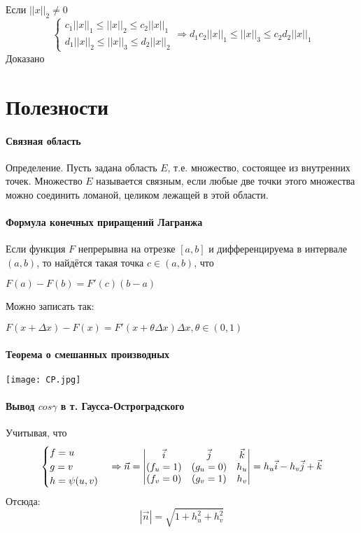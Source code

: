 \documentclass[12pt, english]{article}
\begin{document}
	Если $||x||_2 \neq 0 $
		$$
\begin{cases}
	c_1||x||_1 \leq ||x||_2 \leq c_2||x||_1 \\
	d_1||x||_2 \leq ||x||_3 \leq d_2||x||_2
\end{cases}
\Rightarrow
	d_1 c_2 ||x||_1 \leq ||x||_3  \leq c_2 d_2||x||_1
$$
		Доказано
		
		
		
		
		
		
		
		
		
		

		
\newpage
\part{Полезности}
\subsection{Связная область}\label{eq4}
Определение. Пусть задана область $E$, т.е. множество, состоящее из внутренних точек. Множество $E$ называется связным, если любые две точки этого
множества можно соединить ломаной, целиком лежащей в этой области.

\subsection{Формула конечных приращений Лагранжа}\label{eq5}	
Если функция $F$ непрерывна на отрезке $[a,b]$  и дифференцируема в интервале $(a,b)$, то найдётся такая точка $ c\in (a,b)$, что
 
	$F(a) - F(b) = F'(c)(b - a)$
	
	Можно записать так:
	
	$F(x + \Delta x) - F(x) = F'(x + \theta\Delta x)\Delta x , \theta \in (0,1) $

\subsection{Теорема о смешанных производных}\label{eq6}
\texttt{[image: CP.jpg]}	

\subsection{Вывод $cos\gamma$ в т. Гаусса-Остроградского}\label{eq10}
Учитывая, что 
$$
\begin{cases}
   f = u \\
   g = v \\
   h = \psi(u,v)
\end{cases}
\Rightarrow
\vec{n} = 
\begin{vmatrix}
\vec{i} & \vec{j} & \vec{k} \\
(f_u = 1) & (g_u = 0) & h_u \\
(f_v = 0) & (g_v = 1) & h_v 
\end{vmatrix}
=
\-h_u \vec{i} - h_v \vec{j} + \vec{k}
$$
Отсюда:
$$
|\vec{n}| = \sqrt{1+h_u^2 + h_v^2}
$$
\end{document}
